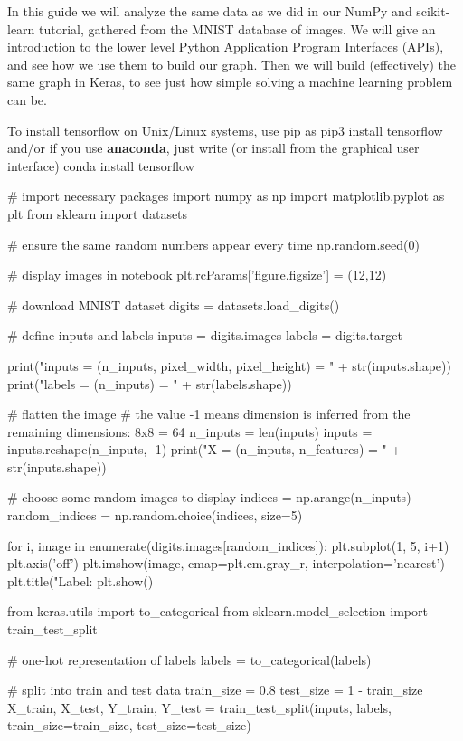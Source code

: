 \documentclass[%
oneside,                 %
final,                   %
10pt]{article}
\begin{document}
In this guide we will analyze the same data as we did in our NumPy and
scikit-learn tutorial, gathered from the MNIST database of images. We
will give an introduction to the lower level Python Application
Program Interfaces (APIs), and see how we use them to build our graph.
Then we will build (effectively) the same graph in Keras, to see just
how simple solving a machine learning problem can be.

To install tensorflow on Unix/Linux systems, use pip as
\bpycod
pip3 install tensorflow
\epycod
and/or if you use \textbf{anaconda}, just write (or install from the graphical user interface)
\bpycod
conda install tensorflow
\epycod


\bpycod
# import necessary packages
import numpy as np
import matplotlib.pyplot as plt
from sklearn import datasets


# ensure the same random numbers appear every time
np.random.seed(0)

# display images in notebook
plt.rcParams['figure.figsize'] = (12,12)


# download MNIST dataset
digits = datasets.load_digits()

# define inputs and labels
inputs = digits.images
labels = digits.target

print("inputs = (n_inputs, pixel_width, pixel_height) = " + str(inputs.shape))
print("labels = (n_inputs) = " + str(labels.shape))


# flatten the image
# the value -1 means dimension is inferred from the remaining dimensions: 8x8 = 64
n_inputs = len(inputs)
inputs = inputs.reshape(n_inputs, -1)
print("X = (n_inputs, n_features) = " + str(inputs.shape))


# choose some random images to display
indices = np.arange(n_inputs)
random_indices = np.random.choice(indices, size=5)

for i, image in enumerate(digits.images[random_indices]):
    plt.subplot(1, 5, i+1)
    plt.axis('off')
    plt.imshow(image, cmap=plt.cm.gray_r, interpolation='nearest')
    plt.title("Label: %
plt.show()
\epycod

\bpycod
from keras.utils import to_categorical
from sklearn.model_selection import train_test_split

# one-hot representation of labels
labels = to_categorical(labels)

# split into train and test data
train_size = 0.8
test_size = 1 - train_size
X_train, X_test, Y_train, Y_test = train_test_split(inputs, labels, train_size=train_size,
                                                    test_size=test_size)
\epycod
\end{document}

